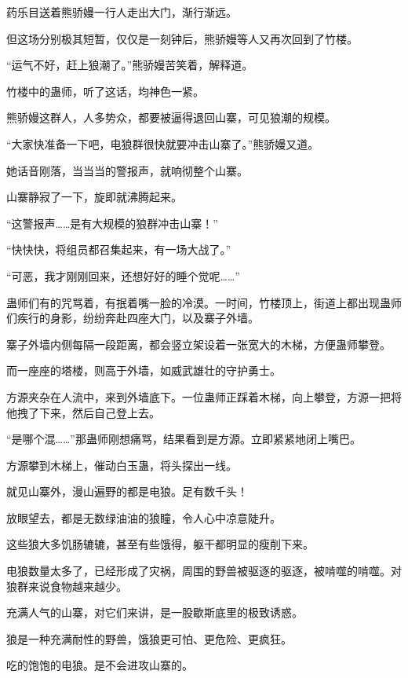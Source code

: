 
\begin{this_body}

药乐目送着熊骄嫚一行人走出大门，渐行渐远。

但这场分别极其短暂，仅仅是一刻钟后，熊骄嫚等人又再次回到了竹楼。

“运气不好，赶上狼潮了。”熊骄嫚苦笑着，解释道。

竹楼中的蛊师，听了这话，均神色一紧。

熊骄嫚这群人，人多势众，都要被逼得退回山寨，可见狼潮的规模。

“大家快准备一下吧，电狼群很快就要冲击山寨了。”熊骄嫚又道。

她话音刚落，当当当的警报声，就响彻整个山寨。

山寨静寂了一下，旋即就沸腾起来。

“这警报声……是有大规模的狼群冲击山寨！”

“快快快，将组员都召集起来，有一场大战了。”

“可恶，我才刚刚回来，还想好好的睡个觉呢……”

蛊师们有的咒骂着，有抿着嘴一脸的冷漠。一时间，竹楼顶上，街道上都出现蛊师们疾行的身影，纷纷奔赴四座大门，以及寨子外墙。

寨子外墙内侧每隔一段距离，都会竖立架设着一张宽大的木梯，方便蛊师攀登。

而一座座的塔楼，则高于外墙，如威武雄壮的守护勇士。

方源夹杂在人流中，来到外墙底下。一位蛊师正踩着木梯，向上攀登，方源一把将他拽了下来，然后自己登上去。

“是哪个混……”那蛊师刚想痛骂，结果看到是方源。立即紧紧地闭上嘴巴。

方源攀到木梯上，催动白玉蛊，将头探出一线。

就见山寨外，漫山遍野的都是电狼。足有数千头！

放眼望去，都是无数绿油油的狼瞳，令人心中凉意陡升。

这些狼大多饥肠辘辘，甚至有些饿得，躯干都明显的瘦削下来。

电狼数量太多了，已经形成了灾祸，周围的野兽被驱逐的驱逐，被啃噬的啃噬。对狼群来说食物越来越少。

充满人气的山寨，对它们来讲，是一股歇斯底里的极致诱惑。

狼是一种充满耐性的野兽，饿狼更可怕、更危险、更疯狂。

吃的饱饱的电狼。是不会进攻山寨的。


\end{this_body}
